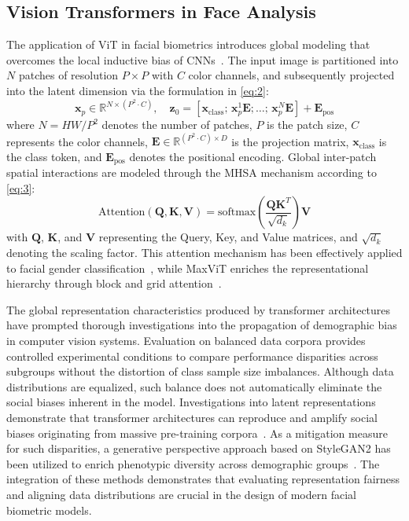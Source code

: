 \subsection{Vision Transformers in Face Analysis}
\label{sec:vision_transformers_face}

The application of ViT in facial biometrics introduces global modeling that overcomes the local inductive bias of CNNs~\cite{ref14}. The input image is partitioned into $N$ patches of resolution $P \times P$ with $C$ color channels, and subsequently projected into the latent dimension via the formulation in \eqref{eq:2}:
\begin{equation}
\mathbf{x}_p \in \mathbb{R}^{N \times (P^2 \cdot C)}, \quad \mathbf{z}_0 = [\mathbf{x}_{\text{class}}; \, \mathbf{x}_p^1\mathbf{E}; \dots; \, \mathbf{x}_p^N\mathbf{E}] + \mathbf{E}_{\text{pos}}
\label{eq:2}
\end{equation}
where $N = HW/P^2$ denotes the number of patches, $P$ is the patch size, $C$ represents the color channels, $\mathbf{E} \in \mathbb{R}^{(P^2 \cdot C) \times D}$ is the projection matrix, $\mathbf{x}_{\text{class}}$ is the class token, and $\mathbf{E}_{\text{pos}}$ denotes the positional encoding. Global inter-patch spatial interactions are modeled through the MHSA mechanism according to \eqref{eq:3}:
\begin{equation}
\text{Attention}(\mathbf{Q}, \mathbf{K}, \mathbf{V}) = \text{softmax}\left(\frac{\mathbf{Q}\mathbf{K}^T}{\sqrt{d_k}}\right)\mathbf{V}
\label{eq:3}
\end{equation}
with $\mathbf{Q}$, $\mathbf{K}$, and $\mathbf{V}$ representing the Query, Key, and Value matrices, and $\sqrt{d_k}$ denoting the scaling factor. This attention mechanism has been effectively applied to facial gender classification~\cite{ref17}, while MaxViT enriches the representational hierarchy through block and grid attention~\cite{ref18}.

The global representation characteristics produced by transformer architectures have prompted thorough investigations into the propagation of demographic bias in computer vision systems. Evaluation on balanced data corpora provides controlled experimental conditions to compare performance disparities across subgroups without the distortion of class sample size imbalances. Although data distributions are equalized, such balance does not automatically eliminate the social biases inherent in the model. Investigations into latent representations demonstrate that transformer architectures can reproduce and amplify social biases originating from massive pre-training corpora~\cite{ref14}. As a mitigation measure for such disparities, a generative perspective approach based on StyleGAN2 has been utilized to enrich phenotypic diversity across demographic groups~\cite{ref15}. The integration of these methods demonstrates that evaluating representation fairness and aligning data distributions are crucial in the design of modern facial biometric models.

